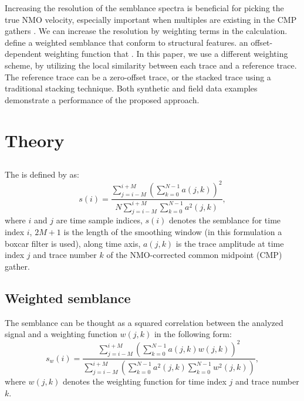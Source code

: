 Increasing the resolution of the semblance spectra is beneficial for picking the true NMO velocity, especially important when multiples are existing in the CMP gathers \cite[]{luosimon2012}. We can increase the resolution by weighting terms in the  calculation.  \cite{hale2009} define a weighted semblance  that conform to structural features. \cite{luosimon2012}  an offset-dependent weighting function that . In this paper, we use a different weighting scheme, by utilizing the local similarity between each trace and a reference trace. The reference trace can be a zero-offset trace, or the stacked trace using a traditional stacking technique. Both synthetic and field data examples demonstrate a  performance of the proposed approach. 

\section{Theory}
\subsection{}
The  is defined by \cite{neidell1971} as:
\begin{equation}
\label{eq:semb}
s(i) = \frac{\displaystyle\sum_{j=i-M}^{i+M}\left(\sum_{k=0}^{N-1}a(j,k)\right)^2}{\displaystyle N\sum_{j=i-M}^{i+M}\sum_{k=0}^{N-1}a^2(j,k)},
\end{equation}
where $i$ and $j$ are time sample indices, $s(i)$ denotes the semblance for time index $i$, $2M+1$ is the length of the smoothing window (in this formulation a boxcar filter is used), along time axis,  $a(j,k)$ is the trace amplitude at time index $j$ and trace number $k$ of the NMO-corrected common midpoint (CMP) gather.


\subsection{Weighted semblance}
The semblance can be thought as a squared correlation between the analyzed signal and a weighting function $w(j,k)$ in the following form:
\begin{equation}
\label{eq:semb-weight}
s_w(i) = \frac{\displaystyle\sum_{j=i-M}^{i+M}\left(\sum_{k=0}^{N-1}a(j,k)w(j,k)\right)^2}{\displaystyle \sum_{j=i-M}^{i+M}\left(\sum_{k=0}^{N-1}a^2(j,k)\sum_{k=0}^{N-1}w^2(j,k)\right)},
\end{equation}
where $w(j,k)$ denotes the weighting function for time index $j$ and trace number $k$.

